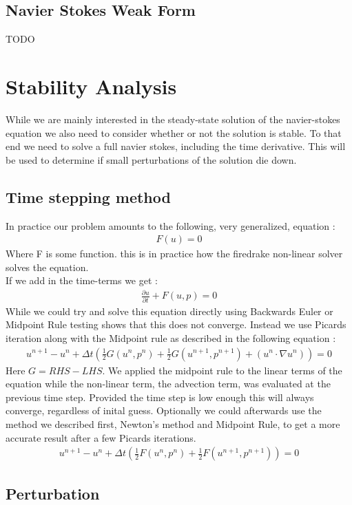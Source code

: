 \documentclass[11pt,twoside,a4paper]{article}
\begin{document}
\subsection{Navier Stokes Weak Form}
TODO
\section{Stability Analysis}

While we are mainly interested in the steady-state solution of the navier-stokes equation we also need to consider whether or not the solution is stable. To that end we need to solve a full navier stokes, including the time derivative. This will be used to determine if small perturbations of the solution die down.
\subsection{Time stepping method}
In practice our problem amounts to the following, very generalized, equation : 
\begin{align}
F(u) = 0
\end{align}
Where F is some function. this is in practice how the firedrake non-linear solver solves the equation.\\
If we add in the time-terms we get :
\begin{align}
\frac{\partial u}{\partial t} + F(u,p) = 0
\end{align}
While we could try and solve this equation directly using Backwards Euler or Midpoint Rule testing shows that this does not converge. Instead we use Picards iteration along with the Midpoint rule as described in the following equation :
\begin{align}
u^{n+1} - u^n + \Delta t (\frac{1}{2}G(u^n,p^n) + \frac{1}{2} G(u^{n+1},p^{n+1}) + ( u^n \cdot \nabla u^n) ) = 0
\end{align}
Here $G = RHS - LHS $. We applied the midpoint rule to the linear terms of the equation while the non-linear term, the advection term, was evaluated at the previous time step. Provided the time step is low enough this will always converge, regardless of inital guess.
Optionally we could afterwards use the method we described first, Newton's method and Midpoint Rule, to get a more accurate result after a few Picards iterations.
\begin{align}
u^{n+1} - u^n + \Delta t (\frac{1}{2}F(u^n,p^n) + \frac{1}{2} F(u^{n+1},p^{n+1})) = 0
\end{align}

\subsection{Perturbation}
\end{document}
